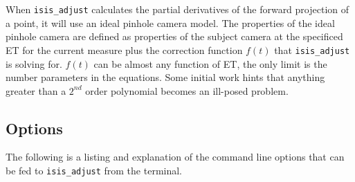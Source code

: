 When \texttt{isis\_adjust} calculates the partial derivatives of the
forward projection of a point, it will use an ideal pinhole camera
model. The properties of the ideal pinhole camera are defined as
properties of the subject camera at the specificed ET for the current
measure plus the correction function $f(t)$ that \texttt{isis\_adjust} is
solving for. $f(t)$ can be almost any function of ET, the only limit is the
number parameters in the equations. Some initial work hints that
anything greater than a $2^{nd}$ order polynomial becomes an ill-posed
problem.

\subsection{Options}

The following is a listing and explanation of the command line options
that can be fed to \texttt{isis\_adjust} from the terminal.

